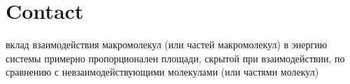 \documentclass[a4paper,12pt]{article}
\begin{document}
\section{Contact}
вклад взаимодействия макромолекул (или частей макромолекул)
в энергию системы примерно пропорционален площади,
скрытой при взаимодействии, по сравнению с
невзаимодействующими молекулами (или частями молекул)
\end{document}
